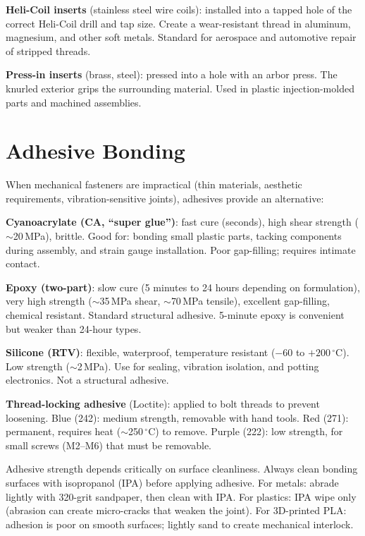 \documentclass[11pt,letterpaper,twoside,openany]{book}
\newcommand{\degC}{\ensuremath{{}^{\circ}\text{C}}}
\begin{document}
\textbf{Heli-Coil inserts} (stainless steel wire coils): installed into a tapped hole of the correct Heli-Coil drill and tap size. Create a wear-resistant thread in aluminum, magnesium, and other soft metals. Standard for aerospace and automotive repair of stripped threads.

\textbf{Press-in inserts} (brass, steel): pressed into a hole with an arbor press. The knurled exterior grips the surrounding material. Used in plastic injection-molded parts and machined assemblies.

\section{Adhesive Bonding}
When mechanical fasteners are impractical (thin materials, aesthetic requirements, vibration-sensitive joints), adhesives provide an alternative:

\textbf{Cyanoacrylate (CA, ``super glue'')}: fast cure (seconds), high shear strength ($\sim$20\,MPa), brittle. Good for: bonding small plastic parts, tacking components during assembly, and strain gauge installation. Poor gap-filling; requires intimate contact.

\textbf{Epoxy (two-part)}: slow cure (5 minutes to 24 hours depending on formulation), very high strength ($\sim$35\,MPa shear, $\sim$70\,MPa tensile), excellent gap-filling, chemical resistant. Standard structural adhesive. 5-minute epoxy is convenient but weaker than 24-hour types.

\textbf{Silicone (RTV)}: flexible, waterproof, temperature resistant ($-60$ to $+200$\,\degC{}). Low strength ($\sim$2\,MPa). Use for sealing, vibration isolation, and potting electronics. Not a structural adhesive.

\textbf{Thread-locking adhesive} (Loctite): applied to bolt threads to prevent loosening. Blue (242): medium strength, removable with hand tools. Red (271): permanent, requires heat ($\sim$250\,\degC{}) to remove. Purple (222): low strength, for small screws (M2--M6) that must be removable.

\begin{warningbox}
Adhesive strength depends critically on surface cleanliness. Always clean bonding surfaces with isopropanol (IPA) before applying adhesive. For metals: abrade lightly with 320-grit sandpaper, then clean with IPA. For plastics: IPA wipe only (abrasion can create micro-cracks that weaken the joint). For 3D-printed PLA: adhesion is poor on smooth surfaces; lightly sand to create mechanical interlock.
\end{warningbox}
\end{document}

